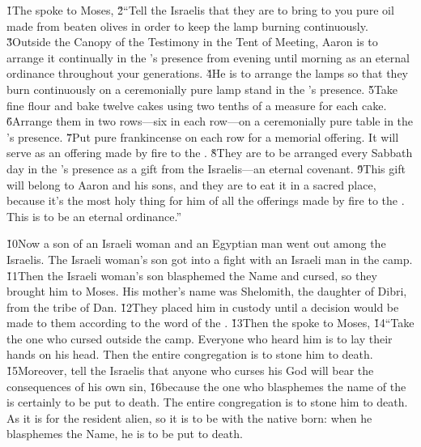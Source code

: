 \v{1}The  spoke to Moses, \v{2}``Tell the Israelis that they are to bring to you pure oil made from beaten olives in order to keep the lamp burning continuously. \v{3}Outside the Canopy of the Testimony in the Tent of Meeting, Aaron is to arrange it continually in the 's presence from evening until morning as an eternal ordinance throughout your generations. \v{4}He is to arrange the lamps so that they burn continuously on a ceremonially pure lamp stand in the 's presence. \v{5}Take fine flour and bake twelve cakes using two tenths of a measure for each cake. \v{6}Arrange them in two rows---six in each row---on a ceremonially pure table in the 's presence. \v{7}Put pure frankincense on each row for a memorial offering. It will serve as an offering made by fire to the . \v{8}They are to be arranged every Sabbath day in the 's presence as a gift from the Israelis---an eternal covenant. \v{9}This gift will belong to Aaron and his sons, and they are to eat it in a sacred place, because it's the most holy thing for him of all the offerings made by fire to the . This is to be an eternal ordinance.''

\v{10}Now a son of an Israeli woman and an Egyptian man went out among the Israelis. The Israeli woman's son got into a fight with an Israeli man in the camp. \v{11}Then the Israeli woman's son blasphemed the Name and cursed, so they brought him to Moses. His mother's name was Shelomith, the daughter of Dibri, from the tribe of Dan. \v{12}They placed him in custody until a decision would be made to them according to the word of the . \v{13}Then the  spoke to Moses, \v{14}``Take the one who cursed outside the camp. Everyone who heard him is to lay their hands on his head. Then the entire congregation is to stone him to death. \v{15}Moreover, tell the Israelis that anyone who curses his God will bear the consequences of his own sin, \v{16}because the one who blasphemes the name of the  is certainly to be put to death. The entire congregation is to stone him to death. As it is for the resident alien, so it is to be with the native born: when he blasphemes the Name, he is to be put to death.

